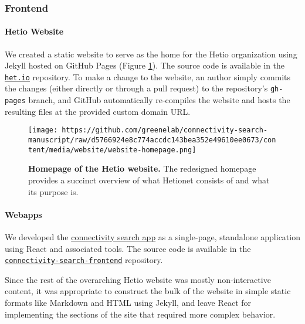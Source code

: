 \hypertarget{frontend}{%
\subsubsection{Frontend}\label{frontend}}

\hypertarget{hetio-website}{%
\paragraph{Hetio Website}\label{hetio-website}}

We created a static website to serve as the home for the Hetio organization using Jekyll hosted on GitHub Pages (Figure \ref{fig:website}).
The source code is available in the \href{https://github.com/hetio/het.io}{\texttt{het.io}} repository.
To make a change to the website, an author simply commits the changes (either directly or through a pull request) to the repository's \texttt{gh-pages} branch, and GitHub automatically re-compiles the website and hosts the resulting files at the provided custom domain URL.

\begin{figure}
\hypertarget{fig:website}{%
\centering
\texttt{[image: https://github.com/greenelab/connectivity-search-manuscript/raw/d5766924e8c774accdc143bea352e49610ee0673/content/media/website/website-homepage.png]}
\caption{\textbf{Homepage of the Hetio website.}
The redesigned homepage provides a succinct overview of what Hetionet consists of and what its purpose is.}\label{fig:website}
}
\end{figure}

\hypertarget{webapps}{%
\paragraph{Webapps}\label{webapps}}

We developed the \href{https://het.io/search}{connectivity search app} as a single-page, standalone application using React and associated tools.
The source code is available in the \href{https://github.com/greenelab/connectivity-search-frontend}{\texttt{connectivity-search-frontend}} repository.

Since the rest of the overarching Hetio website was mostly non-interactive content, it was appropriate to construct the bulk of the website in simple static formats like Markdown and HTML using Jekyll, and leave React for implementing the sections of the site that required more complex behavior.


